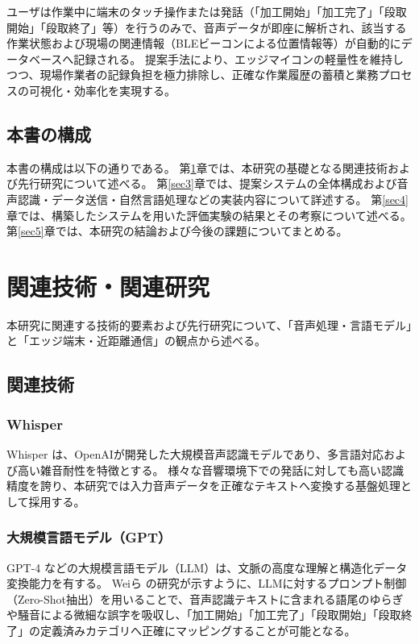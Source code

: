 \documentclass[a4paper,12pt,ja=standard,lualatex]{bxjsarticle}
\begin{document}
ユーザは作業中に端末のタッチ操作または発話（「加工開始」「加工完了」「段取開始」「段取終了」等）を行うのみで、音声データが即座に解析され、該当する作業状態および現場の関連情報（BLEビーコンによる位置情報等）が自動的にデータベースへ記録される。
提案手法により、エッジマイコンの軽量性を維持しつつ、現場作業者の記録負担を極力排除し、正確な作業履歴の蓄積と業務プロセスの可視化・効率化を実現する。

\subsection{本書の構成}
本書の構成は以下の通りである。
第\ref{sec2}章では、本研究の基礎となる関連技術および先行研究について述べる。
第\ref{sec3}章では、提案システムの全体構成および音声認識・データ送信・自然言語処理などの実装内容について詳述する。
第\ref{sec4}章では、構築したシステムを用いた評価実験の結果とその考察について述べる。
第\ref{sec5}章では、本研究の結論および今後の課題についてまとめる。

\newpage

\section{関連技術・関連研究}\label{sec2}
本研究に関連する技術的要素および先行研究について、「音声処理・言語モデル」と「エッジ端末・近距離通信」の観点から述べる。

\subsection{関連技術}
\subsubsection{Whisper}
Whisper \cite{radford2023whisper} は、OpenAIが開発した大規模音声認識モデルであり、多言語対応および高い雑音耐性を特徴とする。
様々な音響環境下での発話に対しても高い認識精度を誇り、本研究では入力音声データを正確なテキストへ変換する基盤処理として採用する。

\subsubsection{大規模言語モデル（GPT）}
GPT-4 \cite{openai2023gpt4} などの大規模言語モデル（LLM）は、文脈の高度な理解と構造化データ変換能力を有する。
Weiら \cite{wei2023zero} の研究が示すように、LLMに対するプロンプト制御（Zero-Shot抽出）を用いることで、音声認識テキストに含まれる語尾のゆらぎや騒音による微細な誤字を吸収し、「加工開始」「加工完了」「段取開始」「段取終了」の定義済みカテゴリへ正確にマッピングすることが可能となる。
\end{document}
